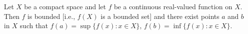 Let $X$ be a compact space and let $f$ be a continuous real-valued function on $X$. Then $f$ is bounded [i.e., $f(X)$ is a bounded set] and there exist points $a$ and $b$ in $X$ such that $f(a) = \sup\{f(x) : x \in X\}$, $f(b) = \inf\{f(x) : x \in X\}$.